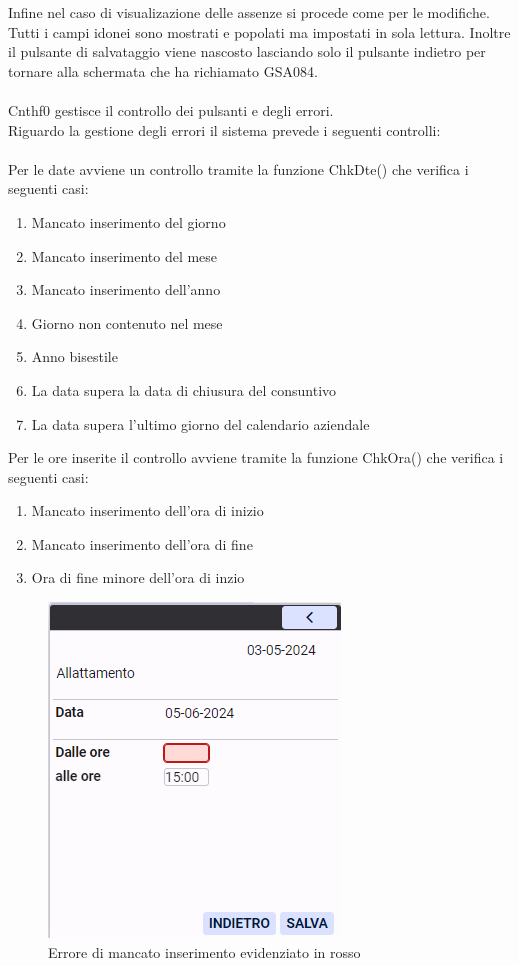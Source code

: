 \documentclass[target=bach,aauheader=,style=]{thud}
\begin{document}
Infine nel caso di visualizazione delle assenze si procede come per le modifiche. Tutti i campi idonei sono mostrati e popolati ma impostati in sola lettura. Inoltre il pulsante di salvataggio viene nascosto lasciando solo il pulsante indietro per tornare alla schermata che ha richiamato GSA084.
\\
\\Cnthf0 gestisce il controllo dei pulsanti e degli errori.
\\Riguardo la gestione degli errori il sistema prevede i seguenti controlli:
\\
\\Per le date avviene un controllo tramite la funzione ChkDte() che verifica i seguenti casi:
\begin{enumerate}
    \item Mancato inserimento del giorno
    \item Mancato inserimento del mese
    \item Mancato inserimento dell'anno
    \item Giorno non contenuto nel mese
    \item Anno bisestile
    \item La data supera la data di chiusura del consuntivo
    \item La data supera l'ultimo giorno del calendario aziendale
\end{enumerate}
Per le ore inserite il controllo avviene tramite la funzione ChkOra() che verifica i seguenti casi:
\begin{enumerate}
    \item Mancato inserimento dell'ora di inizio
    \item Mancato inserimento dell'ora di fine
    \item Ora di fine minore dell'ora di inzio
\end{enumerate}

\begin{figure}[h]
    \centering
    \includegraphics[width=0.35\linewidth]{screenshot/Interfaccia_gsa084_errore.png}
    \caption{Errore di mancato inserimento evidenziato in rosso}
\end{figure}
\end{document}
